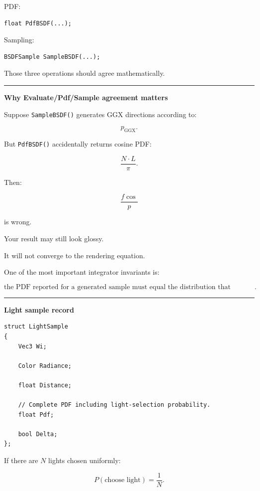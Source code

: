 PDF:

\begin{verbatim}
float PdfBSDF(...);
\end{verbatim}

Sampling:

\begin{verbatim}
BSDFSample SampleBSDF(...);
\end{verbatim}

Those three operations should agree mathematically.

\begin{center}\rule{0.5\linewidth}{0.5pt}\end{center}

\textbf{Why Evaluate/Pdf/Sample agreement matters}

Suppose \texttt{SampleBSDF()} generates GGX directions according to:

\[
p_{\text{GGX}}.
\]

But \texttt{PdfBSDF()} accidentally returns cosine PDF:

\[
\frac{N\cdot L}{\pi}.
\]

Then:

\[
\frac{f\cos}{p}
\]

is wrong.

Your result may still look glossy.

It will not converge to the rendering equation.

One of the most important integrator invariants is:

\[
\boxed{
\text{the PDF reported for a generated sample must equal the distribution that actually generated it}.
}
\]

\begin{center}\rule{0.5\linewidth}{0.5pt}\end{center}

\textbf{Light sample record}

\begin{verbatim}
struct LightSample
{
    Vec3 Wi;

    Color Radiance;

    float Distance;

    // Complete PDF including light-selection probability.
    float Pdf;

    bool Delta;
};
\end{verbatim}

If there are \(N\) lights chosen uniformly:

\[
P(\text{choose light})
=
\frac1N.
\]

